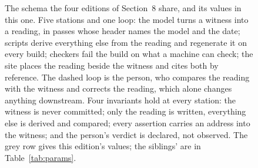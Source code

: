 \begin{figure}[htbp]
{}
\caption{The schema the four editions of Section~8 share, and its values in this
one. Five stations and one loop: the model turns a witness into a reading, in
passes whose header names the model and the date; scripts derive everything
else from the reading and regenerate it on every build; checkers fail the build
on what a machine can check; the site places the reading beside the witness
and cites both by reference. The dashed loop is the person, who compares the
reading with the witness and corrects the reading, which alone changes anything
downstream. Four invariants hold at every station: the witness is never committed;
only the reading is written, everything else is derived and compared; every
assertion carries an address into the witness; and the person's verdict is
declared, not observed. The grey row gives this edition's values; the siblings'
are in Table~\ref{tab:params}.}\label{fig:pipeline}
\end{figure}
